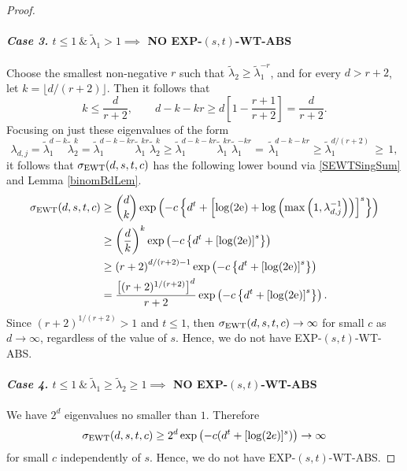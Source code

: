 \documentclass[graybox]{svmult}
\newcommand{\tlambda}{\widetilde{\lambda}}
\newcommand{\me}{\mathrm{e}}
\newcommand{\SEWT}{\sigma_{\textup{EWT}}}
\newcommand{\EXP}{\textup{EXP}\xspace}
\newcommand{\ABS}{\textup{ABS}\xspace}
\newcommand{\WT}{\textup{WT}\xspace}
\begin{document}
\begin{proof}
\paragraph{\textit{Case 3.} $t\le 1 \ \&  \ \tlambda_1 > 1 \implies$ NO \EXP-$(s,t)$-\WT-\ABS} \label{Case111f}

        Choose the smallest non-negative $r$ such that $\tlambda_2 \ge
        \tlambda_1^{-r}$, and for every $d > r+2$, let $k = \lfloor
        d/(r+2) \rfloor$.
        Then it follows that
        \begin{equation*}
        k \le \frac{d}{r+2}, \qquad d - k - kr \ge d\left[1 -\frac{r+1}{r+2} \right] = \frac{d}{r+2}.
        \end{equation*}
        Focusing on just these eigenvalues of the form
        \begin{equation*}
        \lambda_{d,j} = \tlambda_1^{d-k}  \tlambda_2^{k} =  \tlambda_1^{d-k-kr}  \tlambda_1^{kr}\tlambda_2^{k} \ge
        \tlambda_1^{d-k-kr}  \tlambda_1^{kr} \tlambda_1^{-kr} =\, \tlambda_1^{d-k-kr} \ge \tlambda_1^{d/(r+2)} \,\ge\, 1,
        \end{equation*}
        it follows that $\SEWT(d,s,t,c )$ has the following lower
        bound via \eqref{SEWTSingSum} and Lemma \ref{binomBdLem}.
        \begin{align*}
        \nonumber
        \SEWT(d,s,t,c )
        & \ge \binom{d}{k} \exp\left( -c \left \{d^t + \left [ \log(2\me) + \log \left(\max\left(1, \lambda_{d,j}^{-1} \right) \right) \right]^s \right \}\right) \\
        & \ge \left(\frac{d}{k}\right)^k \exp\left( -c \left \{d^t + \left [ \log(2\me) \right]^s \right \}\right) \\
        & \ge \left(r+2\right)^{d/(r+2) - 1} \exp\left( -c \left \{d^t + \left [ \log(2\me) \right]^s \right \}\right) \\
        & = \frac{\bigl[(r+2)^{1/(r+2)}\bigr]^d}{r+2} \exp\left( -c \left \{d^t + \left [ \log(2\me) \right]^s \right \}\right).
        \end{align*}
        Since $(r+2)^{1/(r+2)} > 1$ and $t \le 1$, then $\SEWT(d,s,t,c ) \to \infty$ for small $c$ as $d \to \infty$, regardless of the value of $s$.
        Hence, we do not have \EXP-$(s,t)$-\WT-\ABS.


\paragraph{\textit{Case 4.} $t\le 1 \ \&  \ \tlambda_1\ge\tlambda_2\ge1 \implies$ NO \EXP-$(s,t)$-\WT-\ABS }
 We have $2^d$ eigenvalues no smaller than $1$. Therefore
        $$
        \SEWT(d,s,t,c )\ge 2^d\exp\left(-c(d^t+[\log(2e)]^s)\right)
        \to \infty
        $$
        for small $c$ independently of $s$.
        Hence, we do not have \EXP-$(s,t)$-\WT-\ABS.




\end{proof}
\end{document}
